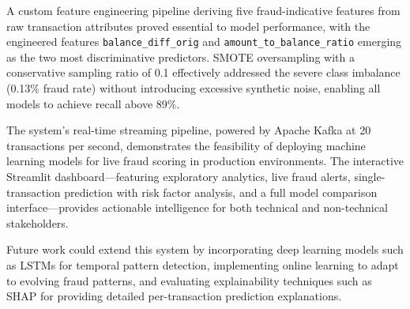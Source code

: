 \documentclass[conference]{IEEEtran}
\begin{document}
A custom feature engineering pipeline deriving five fraud-indicative features from raw transaction attributes proved essential to model performance, with the engineered features \texttt{balance\_diff\_orig} and \texttt{amount\_to\_balance\_ratio} emerging as the two most discriminative predictors. SMOTE oversampling with a conservative sampling ratio of 0.1 effectively addressed the severe class imbalance (0.13\% fraud rate) without introducing excessive synthetic noise, enabling all models to achieve recall above 89\%.

The system's real-time streaming pipeline, powered by Apache Kafka at 20 transactions per second, demonstrates the feasibility of deploying machine learning models for live fraud scoring in production environments. The interactive Streamlit dashboard---featuring exploratory analytics, live fraud alerts, single-transaction prediction with risk factor analysis, and a full model comparison interface---provides actionable intelligence for both technical and non-technical stakeholders.

Future work could extend this system by incorporating deep learning models such as LSTMs for temporal pattern detection, implementing online learning to adapt to evolving fraud patterns, and evaluating explainability techniques such as SHAP for providing detailed per-transaction prediction explanations.
\end{document}
